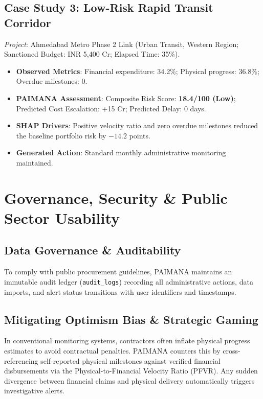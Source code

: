 \documentclass[conference]{IEEEtran}
\begin{document}
\subsection{Case Study 3: Low-Risk Rapid Transit Corridor}
\textit{Project}: Ahmedabad Metro Phase 2 Link (Urban Transit, Western Region; Sanctioned Budget: INR 5,400 Cr; Elapsed Time: 35\%).
\begin{itemize}
    \item \textbf{Observed Metrics}: Financial expenditure: 34.2\%; Physical progress: 36.8\%; Overdue milestones: 0.
    \item \textbf{PAIMANA Assessment}: Composite Risk Score: \textbf{18.4/100 (Low)}; Predicted Cost Escalation: +15 Cr; Predicted Delay: 0 days.
    \item \textbf{SHAP Drivers}: Positive velocity ratio and zero overdue milestones reduced the baseline portfolio risk by $-14.2$ points.
    \item \textbf{Generated Action}: Standard monthly administrative monitoring maintained.
\end{itemize}

\section{Governance, Security \& Public Sector Usability}

\subsection{Data Governance \& Auditability}
To comply with public procurement guidelines, PAIMANA maintains an immutable audit ledger (\texttt{audit\_logs}) recording all administrative actions, data imports, and alert status transitions with user identifiers and timestamps.

\subsection{Mitigating Optimism Bias \& Strategic Gaming}
In conventional monitoring systems, contractors often inflate physical progress estimates to avoid contractual penalties. PAIMANA counters this by cross-referencing self-reported physical milestones against verified financial disbursements via the Physical-to-Financial Velocity Ratio (PFVR). Any sudden divergence between financial claims and physical delivery automatically triggers investigative alerts.
\end{document}
